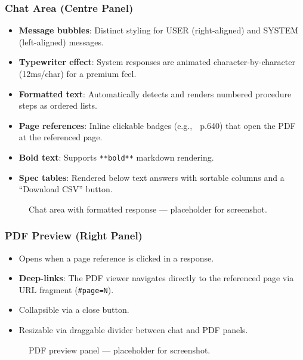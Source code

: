 \documentclass[12pt, a4paper]{article}
\begin{document}
\subsubsection{Chat Area (Centre Panel)}
\begin{itemize}[itemsep=2pt]
  \item \textbf{Message bubbles}: Distinct styling for USER (right-aligned) and SYSTEM (left-aligned) messages.
  \item \textbf{Typewriter effect}: System responses are animated character-by-character (12ms/char) for a premium feel.
  \item \textbf{Formatted text}: Automatically detects and renders numbered procedure steps as ordered lists.
  \item \textbf{Page references}: Inline clickable badges (e.g., 📄 p.640) that open the PDF at the referenced page.
  \item \textbf{Bold text}: Supports \texttt{**bold**} markdown rendering.
  \item \textbf{Spec tables}: Rendered below text answers with sortable columns and a ``Download CSV'' button.
\end{itemize}

\begin{figure}[H]
\centering
{}
\caption{Chat area with formatted response — placeholder for screenshot.}
\label{fig:ui-chat}
\end{figure}

\subsubsection{PDF Preview (Right Panel)}
\begin{itemize}[itemsep=2pt]
  \item Opens when a page reference is clicked in a response.
  \item \textbf{Deep-links}: The PDF viewer navigates directly to the referenced page via URL fragment (\texttt{\#page=N}).
  \item Collapsible via a close button.
  \item Resizable via draggable divider between chat and PDF panels.
\end{itemize}

\begin{figure}[H]
\centering
{}
\caption{PDF preview panel — placeholder for screenshot.}
\label{fig:ui-pdf}
\end{figure}
\end{document}
